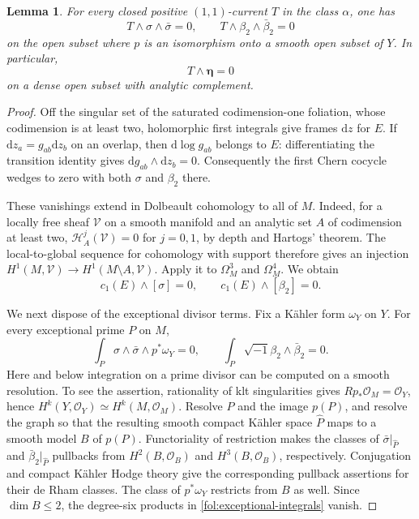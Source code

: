 \documentclass[11pt,letterpaper]{article}
\newtheorem{lemma}[theorem]{Lemma}
\theoremstyle{definition}
\theoremstyle{remark}
\begin{document}
\begin{lemma}\label{fol:annihilation}
For every closed positive $(1,1)$-current $T$ in the class $\alpha$, one has
\begin{equation}\label{fol:annihilations}
 T\wedge\sigma\wedge\bar\sigma=0,\qquad
 T\wedge\beta_2\wedge\bar\beta_2=0
\end{equation}
on the open subset where $p$ is an isomorphism onto a smooth open subset
of $Y$.  In particular,
\begin{equation}\label{fol:T-eta}
 T\wedge\boldsymbol\eta=0
\end{equation}
on a dense open subset with analytic complement.
\end{lemma}

\begin{proof}
Off the singular set of the saturated codimension-one foliation, whose
codimension is at least two, holomorphic first integrals give frames
$\mathrm{d} z$ for $E$.  If $\mathrm{d} z_a=g_{ab}\mathrm{d} z_b$ on an overlap, then
$\mathrm{d}\log g_{ab}$ belongs to $E$: differentiating the transition identity
gives $\mathrm{d} g_{ab}\wedge\mathrm{d} z_b=0$.  Consequently the first Chern cocycle
wedges to zero with both $\sigma$ and $\beta_2$ there.

These vanishings extend in Dolbeault cohomology to all of $M$.  Indeed,
for a locally free sheaf $\mathcal V$ on a smooth manifold and an analytic
set $A$ of codimension at least two,
$\mathcal H^j_A(\mathcal V)=0$ for $j=0,1$, by depth and Hartogs'
theorem.  The local-to-global sequence for cohomology with support
therefore gives an injection
$H^1(M,\mathcal V)\to H^1(M\setminus A,\mathcal V)$.
Apply it to $\Omega_M^3$ and $\Omega_M^4$.  We obtain
\begin{equation}\label{fol:Bott-Chern}
 c_1(E)\wedge[\sigma]=0,\qquad
 c_1(E)\wedge[\beta_2]=0.
\end{equation}

We next dispose of the exceptional divisor terms.  Fix a K\"ahler form
$\omega_Y$ on $Y$.  For every exceptional prime $P$ on $M$,
\begin{equation}\label{fol:exceptional-integrals}
 \int_P \sigma\wedge\bar\sigma\wedge p^*\omega_Y=0,\qquad
 \int_P \sqrt{-1}\beta_2\wedge\bar\beta_2=0.
\end{equation}
Here and below integration on a prime divisor can be computed on a
smooth resolution.  To see the assertion, rationality of klt
singularities gives $Rp_*\mathcal{O}_M=\mathcal{O}_Y$, hence
$H^k(Y,\mathcal{O}_Y)\simeq H^k(M,\mathcal{O}_M)$.  Resolve $P$ and the image $p(P)$,
and resolve the graph so that the resulting smooth compact K\"ahler
space $\widehat P$ maps to a smooth model $B$ of $p(P)$.  Functoriality
of restriction makes the classes of $\bar\sigma|_{\widehat P}$ and
$\bar\beta_2|_{\widehat P}$ pullbacks from $H^2(B,\mathcal{O}_B)$ and
$H^3(B,\mathcal{O}_B)$, respectively.  Conjugation and compact K\"ahler Hodge
theory give the corresponding pullback assertions for their de Rham
classes.  The class of $p^*\omega_Y$ restricts from $B$ as well.
Since $\dim B\leq2$, the degree-six products in
\eqref{fol:exceptional-integrals} vanish.


\end{proof}
\end{document}
